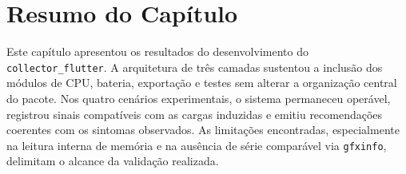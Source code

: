 \section{Resumo do Capítulo}

Este capítulo apresentou os resultados do desenvolvimento do \texttt{collector\_flutter}. A arquitetura de três camadas sustentou a inclusão dos módulos de CPU, bateria, exportação e testes sem alterar a organização central do pacote. Nos quatro cenários experimentais, o sistema permaneceu operável, registrou sinais compatíveis com as cargas induzidas e emitiu recomendações coerentes com os sintomas observados. As limitações encontradas, especialmente na leitura interna de memória e na ausência de série comparável via \texttt{gfxinfo}, delimitam o alcance da validação realizada.

\clearpage
